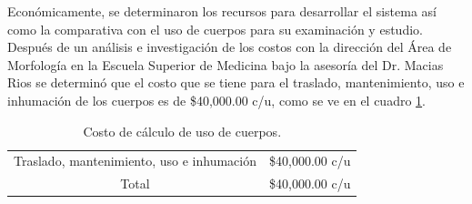 Económicamente, se determinaron los recursos para desarrollar el sistema así como la comparativa con el uso de cuerpos para su examinación y estudio. Después de un análisis e 
investigación de los costos con la dirección del Área de Morfología en la Escuela Superior de Medicina bajo la asesoría del Dr. Macias Rios se determinó que el costo que se 
tiene para el traslado, mantenimiento, uso e inhumación de los cuerpos es de \$40,000.00 c/u, como se ve en el cuadro \ref{tab:t24}.
\begin{table}[H]
\centering
\begin{tabular}{|
>{\columncolor[HTML]{C0C0C0}}c |l|}
\hline
\multicolumn{2}{|c|}{\cellcolor[HTML]{9B9B9B}\textbf{Costo de uso de cuerpos.}} \\ \hline
Traslado, mantenimiento, uso e inhumación           & \$40,000.00 c/u           \\ \hline
Total                                               & \$40,000.00 c/u           \\ \hline
\end{tabular}
\caption{Costo de cálculo de uso de cuerpos.}
\label{tab:t24}
\end{table}

